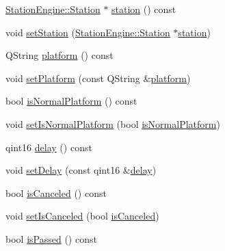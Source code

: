\begin{DoxyCompactItemize}
\item 
\mbox{\hyperlink{classQRail_1_1StationEngine_1_1Station}{Station\+Engine\+::\+Station}} $\ast$ \mbox{\hyperlink{classQRail_1_1RouterEngine_1_1RouteLegEnd_a1b450f1785357c4a54178af375eded94}{station}} () const
\item 
void \mbox{\hyperlink{classQRail_1_1RouterEngine_1_1RouteLegEnd_acfd352512a9edeba950c4941401621eb}{set\+Station}} (\mbox{\hyperlink{classQRail_1_1StationEngine_1_1Station}{Station\+Engine\+::\+Station}} $\ast$\mbox{\hyperlink{classQRail_1_1RouterEngine_1_1RouteLegEnd_a1b450f1785357c4a54178af375eded94}{station}})
\item 
Q\+String \mbox{\hyperlink{classQRail_1_1RouterEngine_1_1RouteLegEnd_a717989d9bc8bc806cc09234b7259a060}{platform}} () const
\item 
void \mbox{\hyperlink{classQRail_1_1RouterEngine_1_1RouteLegEnd_a3512f68f2e4b0fd3e118cfcee7c27dbc}{set\+Platform}} (const Q\+String \&\mbox{\hyperlink{classQRail_1_1RouterEngine_1_1RouteLegEnd_a717989d9bc8bc806cc09234b7259a060}{platform}})
\item 
bool \mbox{\hyperlink{classQRail_1_1RouterEngine_1_1RouteLegEnd_a5338d1744cd3e938b192fb30d45cefca}{is\+Normal\+Platform}} () const
\item 
void \mbox{\hyperlink{classQRail_1_1RouterEngine_1_1RouteLegEnd_aa4a9c492d60abae431201eabd3f20794}{set\+Is\+Normal\+Platform}} (bool \mbox{\hyperlink{classQRail_1_1RouterEngine_1_1RouteLegEnd_a5338d1744cd3e938b192fb30d45cefca}{is\+Normal\+Platform}})
\item 
qint16 \mbox{\hyperlink{classQRail_1_1RouterEngine_1_1RouteLegEnd_a3fa63ac9d26898a8424c785ea1468e23}{delay}} () const
\item 
void \mbox{\hyperlink{classQRail_1_1RouterEngine_1_1RouteLegEnd_aefcf7263d85e5c68ced3795df3ed9b0a}{set\+Delay}} (const qint16 \&\mbox{\hyperlink{classQRail_1_1RouterEngine_1_1RouteLegEnd_a3fa63ac9d26898a8424c785ea1468e23}{delay}})
\item 
bool \mbox{\hyperlink{classQRail_1_1RouterEngine_1_1RouteLegEnd_a305be14990f34fd8a5864f1b9e8b967e}{is\+Canceled}} () const
\item 
void \mbox{\hyperlink{classQRail_1_1RouterEngine_1_1RouteLegEnd_ad3543e5a45ebda2ae0bd26fe8eba9d17}{set\+Is\+Canceled}} (bool \mbox{\hyperlink{classQRail_1_1RouterEngine_1_1RouteLegEnd_a305be14990f34fd8a5864f1b9e8b967e}{is\+Canceled}})
\item 
bool \mbox{\hyperlink{classQRail_1_1RouterEngine_1_1RouteLegEnd_a0ecabab3a1a0a3c5df1174ace72bb153}{is\+Passed}} () const

\end{DoxyCompactItemize}
